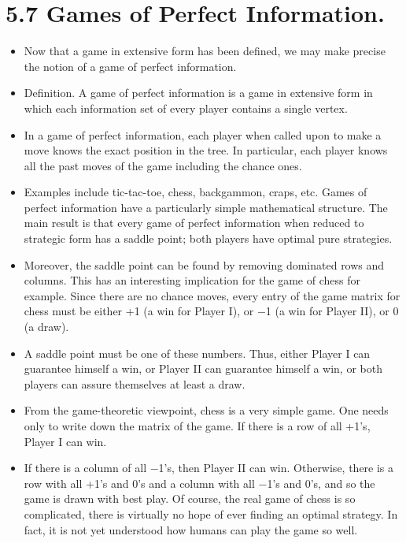 \documentclass[]{report}
\begin{document}
\section{5.7 Games of Perfect Information.} 
\begin{itemize}
\item Now that a game in extensive form has been
defined, we may make precise the notion of a game of perfect information.
\item Definition. A game of perfect information is a game in extensive form in which each
information set of every player contains a single vertex.
\item In a game of perfect information, each player when called upon to make a move knows
the exact position in the tree. In particular, each player knows all the past moves of the
game including the chance ones.
\item  Examples include tic-tac-toe, chess, backgammon, craps,
etc.
Games of perfect information have a particularly simple mathematical structure. The
main result is that every game of perfect information when reduced to strategic form has
a saddle point; both players have optimal pure strategies.
\item Moreover, the saddle point can
be found by removing dominated rows and columns. This has an interesting implication
for the game of chess for example. Since there are no chance moves, every entry of the
game matrix for chess must be either +1 (a win for Player I), or −1 (a win for Player
II), or 0 (a draw). \item A saddle point must be one of these numbers. Thus, either Player
I can guarantee himself a win, or Player II can guarantee himself a win, or both players
can assure themselves at least a draw.\item From the game-theoretic viewpoint, chess is a very
simple game. One needs only to write down the matrix of the game. If there is a row of all
+1’s, Player I can win. \item If there is a column of all −1’s, then Player II can win. Otherwise,
there is a row with all +1’s and 0’s and a column with all −1’s and 0’s, and so the game is
drawn with best play. Of course, the real game of chess is so complicated, there is virtually
no hope of ever finding an optimal strategy. In fact, it is not yet understood how humans
can play the game so well.
\end{itemize}
\end{document}
